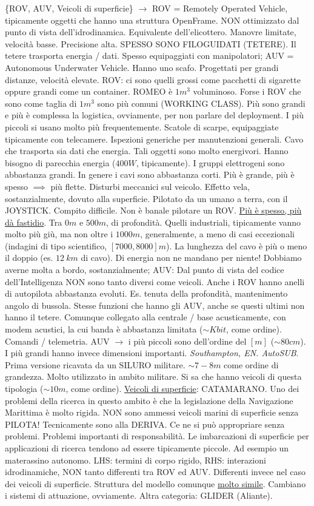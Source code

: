 \{ROV, AUV, Veicoli di superficie\} $\rightarrow$ ROV = Remotely Operated Vehicle, tipicamente oggetti che hanno una struttura OpenFrame. NON ottimizzato dal punto di vista dell'idrodinamica. Equivalente dell'elicottero. Manovre limitate, velocità basse. Precisione alta. SPESSO SONO FILOGUIDATI (TETERE). Il tetere trasporta energia / dati. Spesso equipaggiati con manipolatori; AUV = Autonomous Underwater Vehicle. Hanno uno scafo. Progettati per grandi distanze, velocità elevate. ROV: ci sono quelli grossi come pacchetti di sigarette oppure grandi come un container. ROMEO è $1m^3$ voluminoso. Forse i ROV che sono come taglia di $1m^3$ sono più comuni (WORKING CLASS). Più sono grandi e più è complessa la logistica, ovviamente, per non parlare del deployment. I più piccoli si usano molto più frequentemente. Scatole di scarpe, equipaggiate tipicamente con telecamere. Ispezioni generiche per manutenzioni generali. Cavo che trasporta sia dati che energia. Tali oggetti sono molto energivori. Hanno bisogno di parecchia energia ($400W$, tipicamente). I gruppi elettrogeni sono abbastanza grandi. In genere i cavi sono abbastanza corti. Più è grande, più è spesso $\implies$ più flette. Disturbi meccanici sul veicolo. Effetto vela, sostanzialmente, dovuto alla superficie. Pilotato da un umano a terra, con il JOYSTICK. Compito difficile. Non è banale pilotare un ROV. \underline{Più è spesso, più dà fastidio}. Tra $0m$ e $500m$, di profondità. Quelli industriali, tipicamente vanno molto più giù, ma non oltre i $1000m$, generalmente, a meno di casi eccezionali (indagini di tipo scientifico, $[7000,8000]m$). La lunghezza del cavo è più o meno il doppio (es. $12\ km$ di cavo). Di energia non ne mandano per niente! Dobbiamo averne molta a bordo, sostanzialmente; AUV: Dal punto di vista del codice dell'Intelligenza NON sono tanto diversi come veicoli. Anche i ROV hanno anelli di autopilota abbastanza evoluti. Es. tenuta della profondità, mantenimento angolo di bussola. Stesse funzioni che hanno gli AUV, anche se questi ultimi non hanno il tetere. Comunque collegato alla centrale / base acusticamente, con modem acustici, la cui banda è abbastanza limitata ($\sim Kbit$, come ordine). Comandi / telemetria. AUV $\rightarrow$ i più piccoli sono dell'ordine del $[m]$ ($\sim 80cm$). I più grandi hanno invece dimensioni importanti. \textit{Southampton, EN. AutoSUB}. Prima versione ricavata da un SILURO militare. $\sim 7-8m$ come ordine di grandezza. Molto utilizzato in ambito militare. Si sa che hanno veicoli di questa tipologia ($\sim 10m$, come ordine). \underline{Veicoli di superficie}: CATAMARANO. Uno dei problemi della ricerca in questo ambito è che la legislazione della Navigazione Marittima è molto rigida. NON sono ammessi veicoli marini di superficie senza PILOTA! Tecnicamente sono alla DERIVA. Ce ne si può appropriare senza problemi. Problemi importanti di responsabilità. Le imbarcazioni di superficie per applicazioni di ricerca tendono ad essere tipicamente piccole. Ad esempio un materassino autonomo. LHS: termini di corpo rigido, RHS: interazioni idrodinamiche, NON tanto differenti tra ROV ed AUV. Differenti invece nel caso dei veicoli di superficie. Struttura del modello comunque \underline{molto simile}. Cambiano i sistemi di attuazione, ovviamente. Altra categoria: GLIDER (Aliante). 